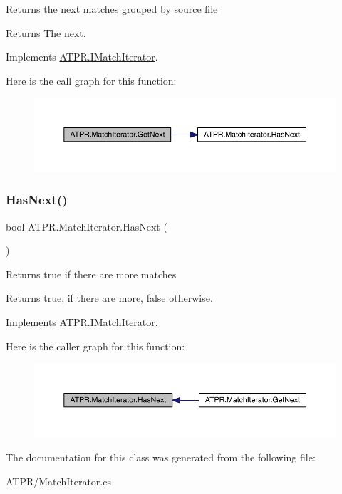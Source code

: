 Returns the next matches grouped by source file 

\begin{DoxyReturn}{Returns}
The next.
\end{DoxyReturn}


Implements \hyperlink{interface_a_t_p_r_1_1_i_match_iterator}{A\+T\+P\+R.\+I\+Match\+Iterator}.

Here is the call graph for this function\+:
\nopagebreak
\begin{figure}[H]
\begin{center}
\leavevmode
\includegraphics[width=350pt]{d1/d21/class_a_t_p_r_1_1_match_iterator_a72658237a15b16825e73b72d3d8ed4e2_cgraph}
\end{center}
\end{figure}
\hypertarget{class_a_t_p_r_1_1_match_iterator_a65b39ac2d89a16934d81a8992767d3e9}{}\label{class_a_t_p_r_1_1_match_iterator_a65b39ac2d89a16934d81a8992767d3e9} 
\subsubsection{\texorpdfstring{Has\+Next()}{HasNext()}}
{\footnotesize\ttfamily bool A\+T\+P\+R.\+Match\+Iterator.\+Has\+Next (\begin{DoxyParamCaption}{ }\end{DoxyParamCaption})\hspace{0.3cm}{\ttfamily [inline]}}



Returns true if there are more matches 

\begin{DoxyReturn}{Returns}
{\ttfamily true}, if there are more, {\ttfamily false} otherwise.
\end{DoxyReturn}


Implements \hyperlink{interface_a_t_p_r_1_1_i_match_iterator}{A\+T\+P\+R.\+I\+Match\+Iterator}.

Here is the caller graph for this function\+:
\nopagebreak
\begin{figure}[H]
\begin{center}
\leavevmode
\includegraphics[width=350pt]{d1/d21/class_a_t_p_r_1_1_match_iterator_a65b39ac2d89a16934d81a8992767d3e9_icgraph}
\end{center}
\end{figure}


The documentation for this class was generated from the following file\+:\begin{DoxyCompactItemize}
\item 
A\+T\+P\+R/Match\+Iterator.\+cs\end{DoxyCompactItemize}
